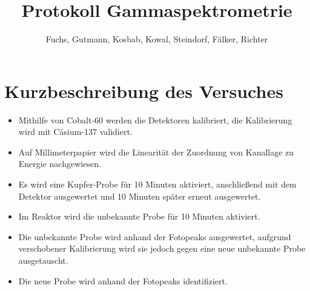 \documentclass[12pt,german]{article}
\title{\vspace{-1.5cm}Protokoll Gammaspektrometrie}
\author{Fuchs, Gutmann, Kosbab, Kowal, Steindorf, Fälker, Richter}
\begin{document}
    \maketitle
    \tableofcontents

    \section{Kurzbeschreibung des Versuches}
    \begin{itemize}
        \item Mithilfe von Cobalt-60 werden die Detektoren kalibriert, die Kalibrierung wird mit Cäsium-137 validiert.
        \item Auf Millimeterpapier wird die Linearität der Zuordnung von Kanallage zu Energie nachgewiesen.
        \item Es wird eine Kupfer-Probe für 10 Minuten aktiviert, anschließend mit dem Detektor ausgewertet und 10 Minuten später erneut ausgewertet.
        \item Im Reaktor wird die unbekannte Probe für 10 Minuten aktiviert.
        \item Die unbekannte Probe wird anhand der Fotopeaks ausgewertet, aufgrund verschobener Kalibrierung wird sie jedoch gegen eine neue unbekannte Probe ausgetauscht.
        \item Die neue Probe wird anhand der Fotopeaks identifiziert.
    \end{itemize}
    \newpage
\end{document}
